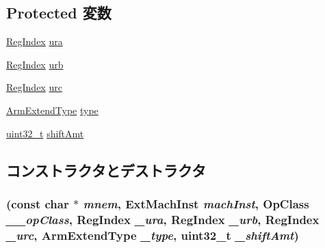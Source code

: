 \subsection*{Protected 変数}
\begin{DoxyCompactItemize}
\item 
\hyperlink{classStaticInst_a36d25e03e43fa3bb4c5482cbefe5e0fb}{RegIndex} \hyperlink{classArmISA_1_1MicroIntRegXOp_a8e6cd3e234a4950e7a1a05f1b24cfee0}{ura}
\item 
\hyperlink{classStaticInst_a36d25e03e43fa3bb4c5482cbefe5e0fb}{RegIndex} \hyperlink{classArmISA_1_1MicroIntRegXOp_a3771d4e6da84a09dbf436d6b1af2be46}{urb}
\item 
\hyperlink{classStaticInst_a36d25e03e43fa3bb4c5482cbefe5e0fb}{RegIndex} \hyperlink{classArmISA_1_1MicroIntRegXOp_a7b2bf3346575e8b24bdd921acf571967}{urc}
\item 
\hyperlink{namespaceArmISA_a4420842b5673543552a3aba317c69dbb}{ArmExtendType} \hyperlink{classArmISA_1_1MicroIntRegXOp_a0822cc4af9f88047e13ca95f7d8c0830}{type}
\item 
\hyperlink{Type_8hh_a435d1572bf3f880d55459d9805097f62}{uint32\_\-t} \hyperlink{classArmISA_1_1MicroIntRegXOp_ae7055048ef987608275e966a35eeba5d}{shiftAmt}
\end{DoxyCompactItemize}


\subsection{コンストラクタとデストラクタ}
\hypertarget{classArmISA_1_1MicroIntRegXOp_a889cae91e98bf874676003ee46d88edb}{
\subsubsection[{MicroIntRegXOp}]{ (const char $\ast$ {\em mnem}, \/  {\bf ExtMachInst} {\em machInst}, \/  OpClass {\em \_\-\_\-opClass}, \/  {\bf RegIndex} {\em \_\-ura}, \/  {\bf RegIndex} {\em \_\-urb}, \/  {\bf RegIndex} {\em \_\-urc}, \/  {\bf ArmExtendType} {\em \_\-type}, \/  {\bf uint32\_\-t} {\em \_\-shiftAmt})}}
\label{classArmISA_1_1MicroIntRegXOp_a889cae91e98bf874676003ee46d88edb}



